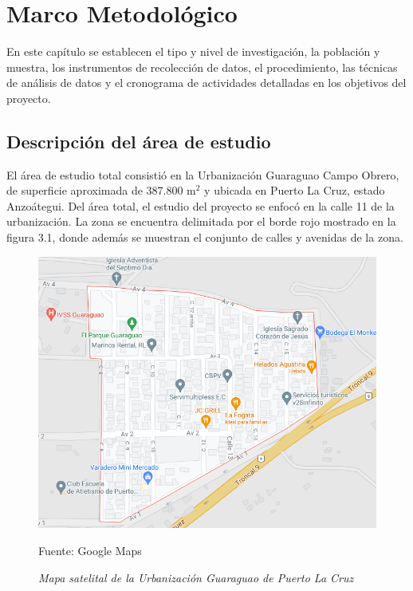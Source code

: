 \vspace*{6cm}
{\setlength{\parskip}{-0.5cm}
\chapter{Marco Metodológico}
}

\newpage

En este capítulo se establecen el tipo y nivel de investigación, la población y muestra, los instrumentos de recolección de datos, el procedimiento, las técnicas de análisis de datos y el cronograma de actividades detalladas en los objetivos del proyecto.

{\setlength{\parskip}{0cm}
\section{Descripción del área de estudio}

El área de estudio total consistió en la Urbanización Guaraguao Campo Obrero, de superficie aproximada de 387.800 m$^2$ y ubicada en Puerto La Cruz, estado Anzoátegui. Del área total, el estudio del proyecto se enfocó en la calle 11 de la urbanización. La zona se encuentra delimitada por el borde rojo mostrado en la figura 3.1, donde además se muestran el conjunto de calles y avenidas de la zona.
}

\begin{figure}[h]
    \centering
    \captionsetup{singlelinecheck=false, justification=raggedright, labelsep=newline}
    \caption{\textit{Mapa satelital de la Urbanización Guaraguao de Puerto La Cruz}}
    \includegraphics[width=15cm]{Media/Urb Guaraguao.png}
    \raggedright Fuente: Google Maps
    \label{fig:mapa}
\end{figure}

